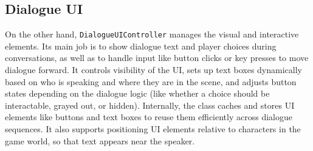 \subsection{Dialogue UI}
\label{devlog:Dialogue UI}
On the other hand, \verb|DialogueUIController| manages the visual and interactive elements. Its main job is to show dialogue text and player choices during conversations, as well as to handle input like button clicks or key presses to move dialogue forward. It controls visibility of the UI, sets up text boxes dynamically based on who is speaking and where they are in the scene, and adjusts button states depending on the dialogue logic (like whether a choice should be interactable, grayed out, or hidden). Internally, the class caches and stores UI elements like buttons and text boxes to reuse them efficiently across dialogue sequences. It also supports positioning UI elements relative to characters in the game world, so that text appears near the speaker.

 